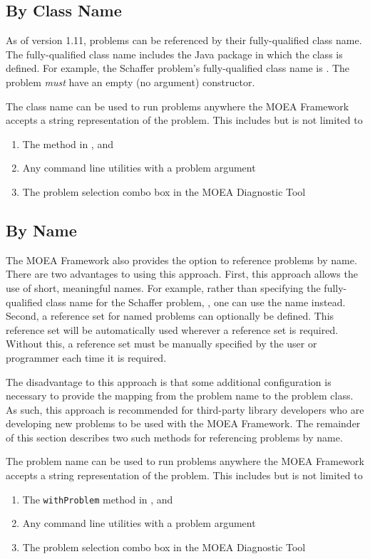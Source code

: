 \subsection{By Class Name}
As of version 1.11, problems can be referenced by their fully-qualified class name.  The fully-qualified class name includes the Java package in which the class is defined.  For example, the Schaffer problem's fully-qualified class name is .  The problem \emph{must} have an empty (no argument) constructor.

The class name can be used to run problems anywhere the MOEA Framework accepts a string representation of the problem.  This includes but is not limited to
\begin{enumerate}
  \item The  method in ,  and 
  \item Any command line utilities with a problem argument
  \item The problem selection combo box in the MOEA Diagnostic Tool
\end{enumerate}

\subsection{By Name}

The MOEA Framework also provides the option to reference problems by name.  There are two advantages to using this approach.  First, this approach allows the use of short, meaningful names.  For example, rather than specifying the fully-qualified class name for the Schaffer problem, , one can use the name  instead.  Second, a reference set for named problems can optionally be defined.  This reference set will be automatically used wherever a reference set is required.  Without this, a reference set must be manually specified by the user or programmer each time it is required.

The disadvantage to this approach is that some additional configuration is necessary to provide the mapping from the problem name to the problem class.  As such, this approach is recommended for third-party library developers who are developing new problems to be used with the MOEA Framework.  The remainder of this section describes two such methods for referencing problems by name.

The problem name can be used to run problems anywhere the MOEA Framework accepts a string representation of the problem.  This includes but is not limited to
\begin{enumerate}
  \item The \texttt{withProblem} method in ,  and 
  \item Any command line utilities with a problem argument
  \item The problem selection combo box in the MOEA Diagnostic Tool
\end{enumerate}


